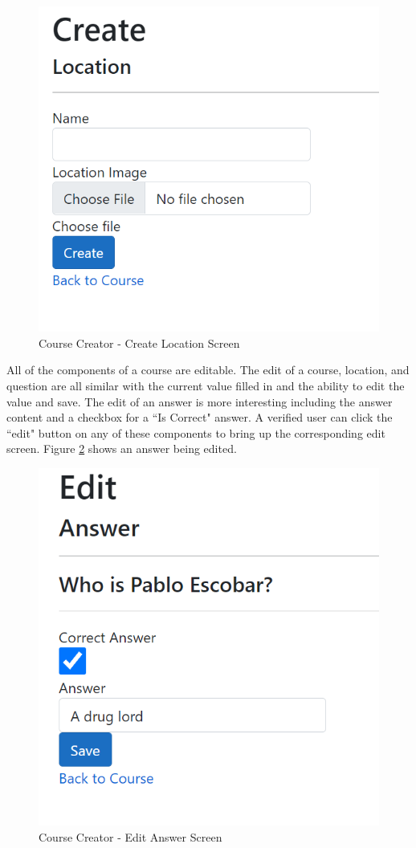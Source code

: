\begin{figure}[htb]
	\centering
	\includegraphics[width=.6\textwidth]{Requirements/assets/cc-create-location.png}
	\caption[Course Creator - Create Location Screen]{\label{CC Create Location}Course Creator - Create Location Screen}
\end{figure}
All of the components of a course are editable. The edit of a course, location, and question are all similar with the current value filled in and the ability to edit the value and save. The edit of an answer is more interesting including the answer content and a checkbox for a ``Is Correct" answer. A verified user can click the ``edit" button on any of these components to bring up the corresponding edit screen. Figure \ref{CC Edit Answer} shows an answer being edited. 
\begin{figure}[htb]
	\centering
	\includegraphics[width=.6\textwidth]{Requirements/assets/cc-edit-answer.png}
	\caption[Course Creator - Edit Answer Screen]{\label{CC Edit Answer}Course Creator - Edit Answer Screen}
\end{figure}
